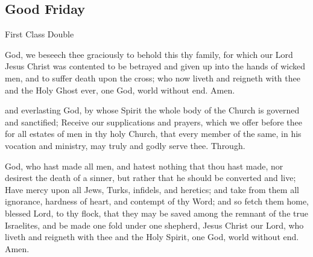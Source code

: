 \subsection{Good Friday}
\fancyhead[RE,LO]{}
\begin{inhead}
    {First Class Double}
\end{inhead}

\collect
{} God, we beseech thee graciously to behold this thy family, for which our Lord Jesus Christ was contented to be betrayed and given up into the hands of wicked men, and to suffer death upon the cross; who now liveth and reigneth with thee and the Holy Ghost ever, one God, world without end. Amen.

 and everlasting God, by whose Spirit the whole body of the Church is governed and sanctified; Receive our supplications and prayers, which we offer before thee for all estates of men in thy holy Church, that every member of the same, in his vocation and ministry, may truly and godly serve thee. Through.

 God, who hast made all men, and hatest nothing that thou hast made, nor desirest the death of a sinner, but rather that he should be converted and live; Have mercy upon all Jews, Turks, infidels, and heretics; and take from them all ignorance, hardness of heart, and contempt of thy Word; and so fetch them home, blessed Lord, to thy flock, that they may be saved among the remnant of the true Israelites, and be made one fold under one shepherd, Jesus Christ our Lord, who liveth and reigneth with thee and the Holy Spirit, one God, world without end. Amen.